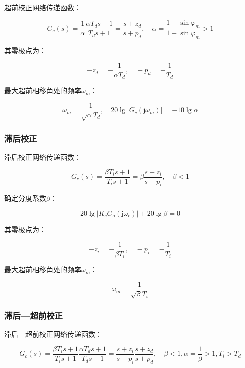 \documentclass[cn, blue, normal, 12pt]{elegantnote}
\begin{document}
超前校正网络传递函数：

\begin{equation}
    G_c(s)=\frac{1}{\alpha}\frac{\alpha T_d s+1}{T_d s+1}=\frac{s+z_d}{s+p_d}, \quad \alpha=\frac{1+\sin{\varphi_m}}{1-\sin{\varphi_m}}>1
\end{equation}

其零极点为：

\begin{equation}
    -z_d=-\frac{1}{\alpha T_d}, \quad -p_d=-\frac{1}{T_d}
\end{equation}

最大超前相移角处的频率$\omega_m$：

\begin{equation}
    \omega_m=\frac{1}{\sqrt{\alpha}T_d}, \quad 20\lg{|G_c(\mathrm{j}\omega_m)|}=-10\lg{\alpha}
\end{equation}

\subsubsection{滞后校正}

滞后校正网络传递函数：

\begin{equation}
    G_c(s)=\frac{\beta T_i s+1}{T_i s+1}=\beta\frac{s+z_i}{s+p_i}, \quad \beta<1
\end{equation}

确定分度系数$\beta$：

\begin{equation}
    20\lg{|K_c G_o(\mathrm{j}\omega_c)|}+20\lg{\beta}=0
\end{equation}

其零极点为：

\begin{equation}
    -z_i=-\frac{1}{\beta T_i}, \quad -p_i=-\frac{1}{T_i}
\end{equation}

最大超前相移角处的频率$\omega_m$：

\begin{equation}
    \omega_m=\frac{1}{\sqrt{\beta}T_i}
\end{equation}

\subsubsection{滞后—超前校正}

滞后—超前校正网络传递函数：

\begin{equation}
    G_c(s)=\frac{\beta T_i s+1}{T_i s+1}\frac{\alpha T_d s+1}{T_d s+1}=\frac{s+z_i}{s+p_i}\frac{s+z_d}{s+p_d}, \quad \beta<1, \alpha=\frac{1}{\beta}>1,T_i>T_d
\end{equation}
\end{document}
